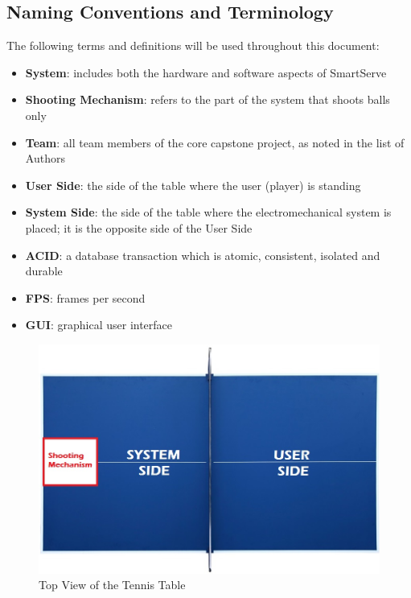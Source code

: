 \documentclass[11pt]{article}
\begin{document}
\subsection{Naming Conventions and Terminology}
\label{sec:definitions}
The following terms and definitions will be used throughout this document:
\begin{itemize}
\item \textbf{System}: includes both the hardware and software aspects of SmartServe
\item \textbf{Shooting Mechanism}: refers to the part of the system that shoots balls only
\item \textbf{Team}: all team members of the core capstone project, as noted in the list of Authors
\item \textbf{User Side}: the side of the table where the user (player) is standing
\item \textbf{System Side}: the side of the table where the electromechanical system is placed; it is the opposite side of the User Side
\item \textbf{ACID}: a database transaction which is atomic, consistent, isolated and durable
\item \textbf{FPS}: frames per second
\item \textbf{GUI}: graphical user interface
\end{itemize}
\begin{figure}[H]
   \centering
   \includegraphics[width=1\textwidth]{img/table-tennis-top-view.jpeg} %
   \caption{Top View of the Tennis Table}
   \label{fig:table-tennis-top-view}
\end{figure}
\end{document}
